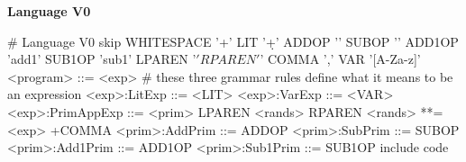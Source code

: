 \begin{minipage}[t]{\sw}
\slidenumber
\LARGE
{\bf Language V0}
\Large
\begin{qv}
# Language V0
skip WHITESPACE '\s+'
LIT '\d+'
ADDOP '\+'
SUBOP '\-'
ADD1OP 'add1'
SUB1OP 'sub1'
LPAREN '\('
RPAREN '\)'
COMMA ','
VAR '[A-Za-z]\w*'
%
<program>        ::= <exp>
# these three grammar rules define what it means to be an expression
<exp>:LitExp     ::= <LIT>
<exp>:VarExp     ::= <VAR>
<exp>:PrimAppExp ::= <prim> LPAREN <rands> RPAREN
<rands>          **= <exp> +COMMA
<prim>:AddPrim   ::= ADDOP
<prim>:SubPrim   ::= SUBOP
<prim>:Add1Prim  ::= ADD1OP
<prim>:Sub1Prim  ::= SUB1OP
%
include code
\end{qv}
\end{minipage}
\clearpage
